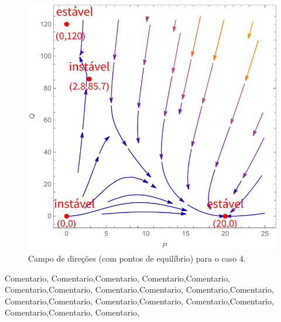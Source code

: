 \begin{figure}[htbp]
\centering
\includegraphics[keepaspectratio=true,scale=0.8]{caso4_c.pdf}
\caption{Campo de direções (com pontos de equilíbrio) para o caso 4.}
\label{fig:www}
\end{figure}
\bigskip
\noindent
Comentario, Comentario,Comentario, Comentario,Comentario, Comentario,Comentario, Comentario,Comentario, Comentario,Comentario, Comentario,Comentario, Comentario,Comentario, Comentario,Comentario, Comentario,Comentario, Comentario,

